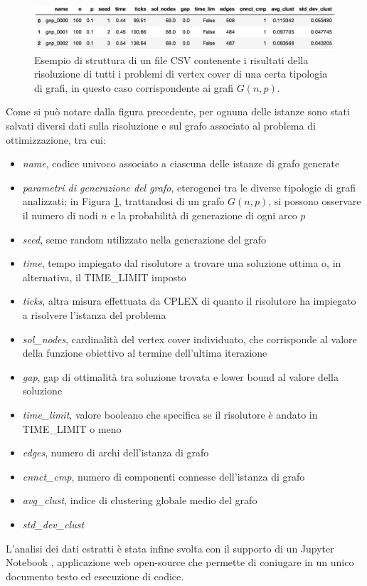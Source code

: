 \begin{figure}[h!]
     \centering
       \includegraphics[scale=0.6]{images/csv.eps}
       \caption{Esempio di struttura di un file CSV contenente i risultati della risoluzione di tutti i problemi di vertex cover di una certa tipologia di grafi, in questo caso corrispondente ai grafi $G(n,p)$.}
        \label{fig:csv}
\end{figure}
Come si può notare dalla figura precedente, per ognuna delle istanze sono stati salvati diversi dati sulla risoluzione e sul grafo associato al problema di ottimizzazione, tra cui:
\begin{itemize}
	\item \textit{name}, codice univoco associato a ciascuna delle istanze di grafo generate
	\item \textit{parametri di generazione del grafo}, eterogenei tra le diverse tipologie di grafi analizzati; in Figura \ref{fig:csv}, trattandosi di un grafo $G(n,p)$, si possono osservare il numero di nodi $n$ e la probabilità di generazione di ogni arco $p$
	\item \textit{seed}, seme random utilizzato nella generazione del grafo
	\item \textit{time}, tempo impiegato dal risolutore a trovare una soluzione ottima o, in alternativa, il TIME\_LIMIT imposto
	\item \textit{ticks}, altra misura effettuata da CPLEX di quanto il risolutore ha impiegato a risolvere l'istanza del problema
	\item \textit{sol\_nodes}, cardinalità del vertex cover individuato, che corrisponde al valore della funzione obiettivo al termine dell'ultima iterazione
	\item \textit{gap}, gap di ottimalità tra soluzione trovata e lower bound al valore della soluzione
	\item \textit{time\_limit}, valore booleano che specifica se il risolutore è andato in TIME\_LIMIT o meno
	\item \textit{edges}, numero di archi dell'istanza di grafo
	\item \textit{cnnct\_cmp}, numero di componenti connesse dell'istanza di grafo
	\item \textit{avg\_clust}, indice di clustering globale medio del grafo
	\item \textit{std\_dev\_clust}
\end{itemize}

L'analisi dei dati estratti è stata infine svolta con il supporto di un Jupyter Notebook \cite{jupyter}, applicazione web open-source che permette di coniugare in un unico documento testo ed esecuzione di codice. 




